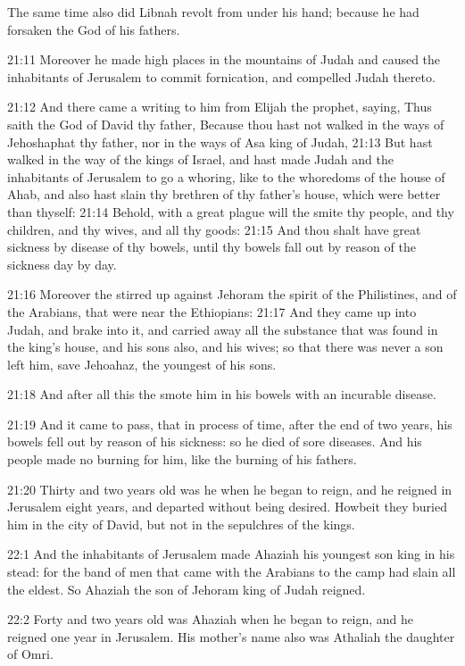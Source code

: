 The same time also did Libnah revolt from under his hand; because he had forsaken the \LORD God of his fathers.

21:11 Moreover he made high places in the mountains of Judah and caused the inhabitants of Jerusalem to commit fornication, and compelled Judah thereto.

21:12 And there came a writing to him from Elijah the prophet, saying, Thus saith the \LORD God of David thy father, Because thou hast not walked in the ways of Jehoshaphat thy father, nor in the ways of Asa king of Judah, 21:13 But hast walked in the way of the kings of Israel, and hast made Judah and the inhabitants of Jerusalem to go a whoring, like to the whoredoms of the house of Ahab, and also hast slain thy brethren of thy father's house, which were better than thyself: 21:14 Behold, with a great plague will the \LORD smite thy people, and thy children, and thy wives, and all thy goods: 21:15 And thou shalt have great sickness by disease of thy bowels, until thy bowels fall out by reason of the sickness day by day.

21:16 Moreover the \LORD stirred up against Jehoram the spirit of the Philistines, and of the Arabians, that were near the Ethiopians: 21:17 And they came up into Judah, and brake into it, and carried away all the substance that was found in the king's house, and his sons also, and his wives; so that there was never a son left him, save Jehoahaz, the youngest of his sons.

21:18 And after all this the \LORD smote him in his bowels with an incurable disease.

21:19 And it came to pass, that in process of time, after the end of two years, his bowels fell out by reason of his sickness: so he died of sore diseases. And his people made no burning for him, like the burning of his fathers.

21:20 Thirty and two years old was he when he began to reign, and he reigned in Jerusalem eight years, and departed without being desired.  Howbeit they buried him in the city of David, but not in the sepulchres of the kings.

22:1 And the inhabitants of Jerusalem made Ahaziah his youngest son king in his stead: for the band of men that came with the Arabians to the camp had slain all the eldest. So Ahaziah the son of Jehoram king of Judah reigned.

22:2 Forty and two years old was Ahaziah when he began to reign, and he reigned one year in Jerusalem. His mother's name also was Athaliah the daughter of Omri.

